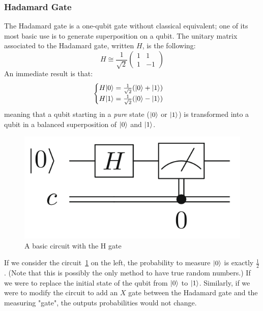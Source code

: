 \documentclass[12pt,a4paper]{article}
\theoremstyle{plain}
\theoremstyle{definition}
\DeclarePairedDelimiter\ket{\lvert}{\rangle}
\begin{document}
\subsubsection{Hadamard Gate}
The Hadamard gate is a one-qubit gate without classical equivalent; one of its most basic use is to generate superposition on a qubit. The unitary matrix associated to the Hadamard gate, written $H$, is the following:
\begin{equation*}
    H \cong \frac{1}{\sqrt{2}}
    \begin{pmatrix}
        1&1\\
        1&-1
    \end{pmatrix}
\end{equation*}
An immediate result is that:
\begin{equation*}
    \begin{cases}
        H\ket{0} = \frac{1}{\sqrt{2}}(\ket{0}+\ket{1}) \\
        H\ket{1} = \frac{1}{\sqrt{2}}(\ket{0}-\ket{1})
    \end{cases}
\end{equation*}
meaning that a qubit starting in a \emph{pure} state ($\ket{0}$ or $\ket{1}$) is transformed into a qubit in a balanced superposition of $\ket{0}$ and $\ket{1}$.

\begin{figure}
    \label{fig:basic-circuit}
    \centering
    \includegraphics*[scale=0.3]{basic-circuit.png}
    \caption{A basic circuit with the H gate}
\end{figure}

If we consider the circuit \ref{fig:basic-circuit} on the left, the probability to measure $\ket{0}$ is exactly $\frac{1}{2}$. (Note that this is possibly the only method to have true random numbers.) If we were to replace the initial state of the qubit from $\ket{0}$ to $\ket{1}$. Similarly, if we were to modify the circuit to add an $X$ gate between the Hadamard gate and the measuring "gate", the outputs probabilities would not change. 
\end{document}
